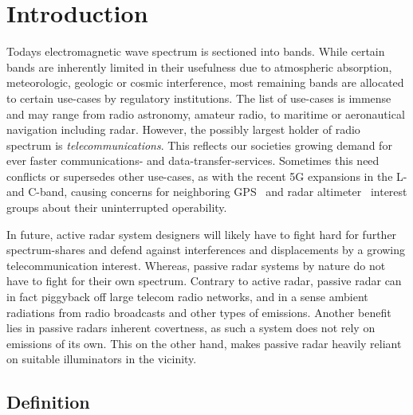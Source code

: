 \chapter{Introduction}\label{chp:introduction}

Todays electromagnetic wave spectrum is sectioned into bands. While certain bands are inherently limited in their usefulness due to atmospheric absorption, meteorologic, geologic or cosmic interference, most remaining bands are allocated to certain use-cases by regulatory institutions. The list of use-cases is immense and may range from radio astronomy, amateur radio, to maritime or aeronautical navigation including radar. However, the possibly largest holder of radio spectrum is \emph{telecommunications}. This reflects our societies growing demand for ever faster communications- and data-transfer-services. Sometimes this need conflicts or supersedes other use-cases, as with the recent 5G expansions in the L- and C-band, causing concerns for neighboring GPS~\cite{GPS.gov2020} and radar altimeter~\cite{RTCA2020} interest groups about their uninterrupted operability.

In future, active radar system designers will likely have to fight hard for further spectrum-shares and defend against interferences and displacements by a growing telecommunication interest. Whereas, passive radar systems by nature do not have to fight for their own spectrum. Contrary to active radar, passive radar can in fact piggyback off large telecom radio networks, and in a sense  ambient radiations from radio broadcasts and other types of emissions. Another benefit lies in passive radars inherent covertness, as such a system does not rely on emissions of its own. This on the other hand, makes passive radar heavily reliant on suitable illuminators in the vicinity.

\section{Definition}

